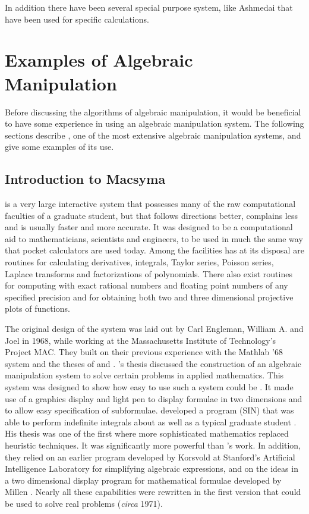 In addition there have been several special purpose system, like Ashmedai
\cite{Levine1976-pq} that have been used for specific calculations.

\section{Examples of Algebraic Manipulation}
 
Before discussing the algorithms of algebraic manipulation, it would be
beneficial to have some experience in using an algebraic manipulation
system.  The following sections describe {\Macsyma}, one of the most extensive
algebraic manipulation systems, and give some examples of its use.

\subsection{Introduction to Macsyma}
\label{Macsyma:Intro:Sec}

{\Macsyma} is a very large interactive system that possesses many of the
raw computational faculties of a graduate student, but that follows
directions better, complains less and is usually faster and more accurate.
It was designed to be a computational aid to mathematicians, scientists and
engineers, to be used in much the same way that pocket calculators are used
today.  Among the facilities {\Macsyma} has at its disposal are routines for
calculating derivatives, integrals, Taylor series, Poisson series, Laplace
transforms and factorizations of polynomials.  There also exist routines
for computing with exact rational numbers and floating point numbers of any
specified precision and for obtaining both two and three dimensional
projective plots of functions.

The original design of the {\Macsyma} system was laid out by Carl Engleman,
William A.  {\MartinW} and Joel {\MosesJ} in 1968, while working at the
Massachusetts Institute of Technology's Project MAC.  They built on their
previous experience with the {\sc Mathlab} '68 system and the theses of
{\MartinW} and {\MosesJ}.  {\MartinW}'s thesis discussed the construction of an
algebraic manipulation system to solve certain problems in applied
mathematics.  This system was designed to show how easy to use such a
system could be \cite{Martin1967-uz}.  It made use of a graphics display
and light pen to display formulae in two dimensions and to allow easy
specification of subformulae.  {\MosesJ} developed a program (SIN) that was
able to perform indefinite integrals about as well as a typical graduate
student \cite{Moses1968-oq}.  His thesis was one of the first where more
sophisticated mathematics replaced heuristic techniques.  It was
significantly more powerful than {\Slagle}'s work.  In addition, they relied
on an earlier program developed by Korsvold \cite{Korsvold1966-ja,Korsvold1965-ml} at Stanford's Artificial Intelligence
Laboratory for simplifying
algebraic expressions, and on the ideas in a two dimensional display
program for mathematical formulae developed by Millen \cite{Millen1968-wc}.
Nearly all these capabilities were rewritten in the first version that
could be used to solve real problems ({\em circa} 1971).

